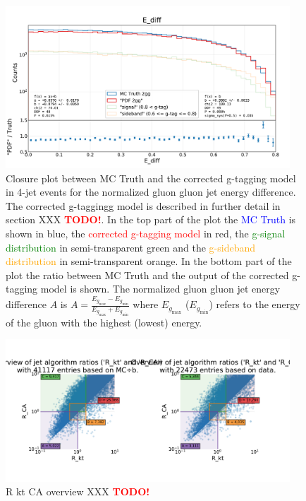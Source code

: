 \documentclass[a4paper, twoside, nobib]{tufte-book}
\newcommand{\code}[1]{\colorbox{light-gray}{\texttt{\detokenize{#1}}}}
\newcommand{\TODO}{\textcolor{red}{\bf TODO!}\xspace}
\begin{document}
\begin{figure}
  \includegraphics[width=0.95\textwidth, trim=0 0 0 65, clip, page=1]{figures/quarks/gtag-closure_test-down_sample=1.00-ML_vars=vertex-selection=b-ejet_min=4-n_iter_RS_lgb=99-n_iter_RS_xgb=9-cdot_cut=0.90-version=19-njet=3.pdf}
  \caption[Closure plot between MC Truth and the corrected g-tagging model in 4-jet events for the normalized gluon gluon jet energy difference]
          {Closure plot between MC Truth and the corrected g-tagging model in 4-jet events for the normalized gluon gluon jet energy difference. The corrected g-taggingg model is described in further detail in section XXX \TODO. In the top part of the plot the \textcolor{blue}{MC Truth} is shown in blue, the \textcolor{red}{corrected g-tagging model} \code{"PDF 2gg"} in red, the \textcolor{green}{g-signal distribution} in semi-transparent green and the \textcolor{orange}{g-sideband distribution} in semi-transparent orange. In the bottom part of the plot the ratio between MC Truth and the output of the corrected g-tagging model is shown. The normalized gluon gluon jet energy difference $A$ is $A=\frac{E_{g_\mathrm{max}}-E_{g_\mathrm{min}}}{E_{g_\mathrm{max}}+E_{g_\mathrm{min}}}$ where $E_{g_\mathrm{max}}$ ($E_{g_\mathrm{min}}$) refers to the energy of the gluon with the highest (lowest) energy.
          } 
  \label{fig:q:closure_E_diff}
\end{figure}


\begin{figure}
  \includegraphics[width=0.95\textwidth, trim=0 0 0 118, clip, page=1]{figures/quarks/gtag-R_kt_CA_overview-down_sample=1.00-ML_vars=vertex-selection=b-ejet_min=4-n_iter_RS_lgb=99-n_iter_RS_xgb=9-cdot_cut=0.90-version=19-njet=4}
  \caption[R kt CA overview  XXX \TODO]
          {R kt CA overview XXX \TODO
          } 
  \label{fig:q:R_kt_CA_overview}
\end{figure}
\end{document}
